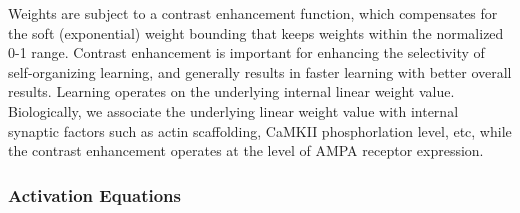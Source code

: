 \documentclass[11pt,twoside]{article}
\newif\myifpdf
\begin{document}
Weights are subject to a contrast enhancement function, which compensates for the soft (exponential) weight bounding that keeps weights within the normalized 0-1 range. Contrast enhancement is important for enhancing the selectivity of self-organizing learning, and generally results in faster learning with better overall results. Learning operates on the underlying internal linear weight value. Biologically, we associate the underlying linear weight value with internal synaptic factors such as actin scaffolding, CaMKII phosphorlation level, etc, while the contrast enhancement operates at the level of AMPA receptor expression. 

\subsubsection{Activation Equations}
\end{document}
